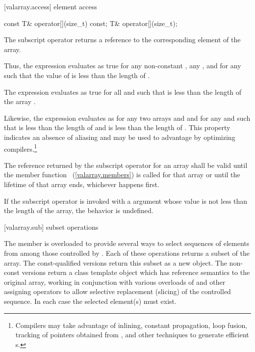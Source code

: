 [valarray.access]{ element access}

%
\begin{itemdecl}
const T&  operator[](size_t) const;
T& operator[](size_t);
\end{itemdecl}

\begin{itemdescr}
\pnum
The subscript operator
returns a reference to the corresponding element of the array.

\pnum
Thus, the expression
evaluates as true for any non-constant
,
any
,
and for any
such that the value of
is less than the length of
.

\pnum
The expression
evaluates as true for all
and
such that
is less than the length of the array
.

\pnum
Likewise, the expression
evaluates as
for any two arrays
and
and for any
and
such that
is less than the length of
and
is less than the length of
.
This property indicates an absence of aliasing and may be used to
advantage by optimizing compilers.\footnote{Compilers may take advantage
of inlining, constant propagation, loop fusion,
tracking of pointers obtained from
,
and other
techniques to generate efficient
s.}

\pnum
The reference returned by the subscript operator for an array shall
be valid until the member function
~(\ref{valarray.members}) is called for that array or until the lifetime of
that array ends, whichever happens first.

\pnum
If the subscript operator
is invoked with a
argument whose value is not
less than the length of the array, the behavior is undefined.%
\end{itemdescr}

[valarray.sub]{ subset operations}

%
\pnum
The member  is overloaded to provide several ways to select
sequences of elements from among those controlled by . Each of these
operations returns a subset of the array. The const-qualified versions return this
subset as a new  object. The non-const versions return a class
template object which has reference semantics to the original array, working in
conjunction with various overloads of  and other assigning
operators to allow selective replacement (slicing) of the controlled sequence.
In each case the selected element(s) must exist.

